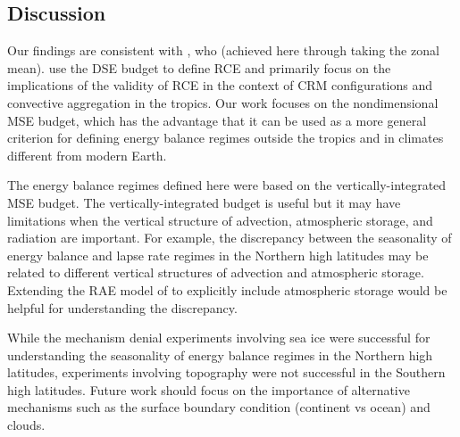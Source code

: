 \documentclass{ametsocV5}
\begin{document}
\subsection{Discussion}
Our findings are consistent with \cite{jakob2019}, who  (achieved here through taking the zonal mean). \cite{jakob2019} use the DSE budget to define RCE and primarily focus on the implications of the validity of RCE in the context of CRM configurations and convective aggregation in the tropics. Our work focuses on the nondimensional MSE budget, which has the advantage that it can be used as a more general criterion for defining energy balance regimes outside the tropics and in climates different from modern Earth.

The energy balance regimes defined here were based on the vertically-integrated MSE budget. The vertically-integrated budget is useful but it may have limitations when the vertical structure of advection, atmospheric storage, and radiation are important. For example, the discrepancy between the seasonality of energy balance and lapse rate regimes in the Northern high latitudes may be related to different vertical structures of advection and atmospheric storage. Extending the RAE model of \cite{cronin2016} to explicitly include atmospheric storage would be helpful for understanding the discrepancy. 

While the mechanism denial experiments involving sea ice were successful for understanding the seasonality of energy balance regimes in the Northern high latitudes, experiments involving topography were not successful in the Southern high latitudes. Future work should focus on the importance of alternative mechanisms such as the surface boundary condition (continent vs ocean) and clouds.
\end{document}
